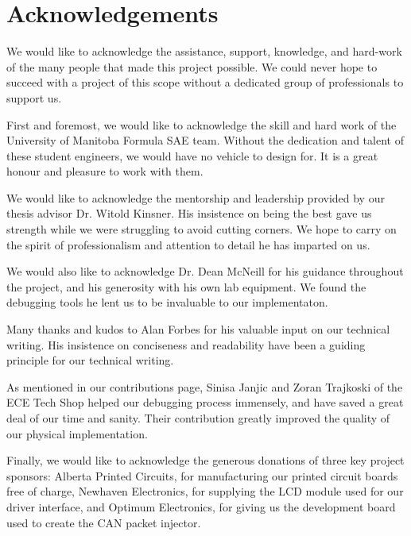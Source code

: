 \chapter*{Acknowledgements}

We would like to acknowledge the assistance, support, knowledge, and hard-work of the many people that made this project possible. We could never hope to succeed with a project of this scope without a dedicated group of professionals to support us.

First and foremost, we would like to acknowledge the skill and hard work of the University of Manitoba Formula SAE team. Without the dedication and talent of these student engineers, we would have no vehicle to design for. It is a great honour and pleasure to work with them.

We would like to acknowledge the mentorship and leadership provided by our thesis advisor Dr. Witold Kinsner. His insistence on being the best gave us strength while we were struggling to avoid cutting corners. We hope to carry on the spirit of professionalism and attention to detail he has imparted on us. 

We would also like to acknowledge Dr. Dean McNeill for his guidance throughout the project, and his generosity with his own lab equipment. We found the debugging tools he lent us to be invaluable to our implementaton.

Many thanks and kudos to Alan Forbes for his valuable input on our technical writing. His insistence on conciseness and readability have been a guiding principle for our technical writing. 

As mentioned in our contributions page, Sinisa Janjic and Zoran Trajkoski of the ECE Tech Shop helped our debugging process immensely, and have saved a great deal of our time and sanity. Their contribution greatly improved the quality of our physical implementation.

Finally, we would like to acknowledge the generous donations of three key project sponsors: Alberta Printed Circuits, for manufacturing our printed circuit boards free of charge, Newhaven Electronics, for supplying the LCD module used for our driver interface, and Optimum Electronics, for giving us the development board used to create the CAN packet injector. 
